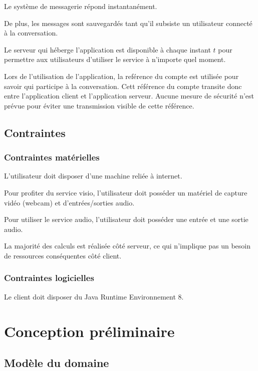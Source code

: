 \documentclass[11pt,dvipsnames,svgnames]{report}
\begin{document}
Le système de messagerie répond instantanément.

De plus, les messages sont sauvegardés tant qu'il subsiste un utilisateur connecté à la conversation.

Le serveur qui héberge l'application est disponible à chaque instant $t$ pour permettre aux utilisateurs d'utiliser le service à n'importe quel moment.

Lors de l'utilisation de l'application, la reférence du compte est utilisée pour savoir qui participe à la conversation. Cett référence du compte transite donc entre l'application client et l'application serveur. Aucune mesure de sécurité n'est prévue pour éviter une transmission visible de cette référence.
\section{Contraintes}
\subsection{Contraintes matérielles}
L'utilisateur doit disposer d'une machine reliée à internet.

Pour profiter du service visio, l'utilisateur doit posséder un matériel de capture vidéo (webcam) et d'entrées/sorties audio.

Pour utiliser le service audio, l'utilisateur doit posséder une entrée et une sortie audio.

La majorité des calculs est réalisée côté serveur, ce qui n'implique pas un besoin de ressources conséquentes côté client.

\subsection{Contraintes logicielles}

Le client doit disposer du Java Runtime Environnement 8.

\chapter{Conception préliminaire}

\section{Modèle du domaine}
\end{document}
